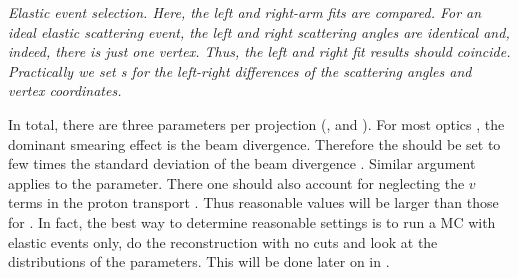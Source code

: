 \itm \em{Elastic event selection}. Here, the left and right-arm fits are compared. For an ideal elastic scattering event, the left and right scattering angles are identical and, indeed, there is just one vertex. Thus, the left and right fit results should coincide. Practically we set s for the left-right differences of the scattering angles and vertex coordinates.
\eitm

In total, there are three parameters per projection (,  and ). For most optics , the dominant smearing effect is the beam divergence. Therefore the  should be set to few times the standard deviation of the beam divergence . Similar argument applies to the  parameter. There one should also account for neglecting the $v$ terms in the proton transport . Thus reasonable values will be larger than those for . In fact, the best way to determine reasonable settings is to run a MC with elastic events only, do the reconstruction with no cuts and look at the distributions of the parameters. This will be done later on in .

